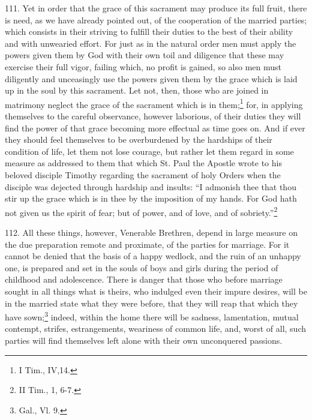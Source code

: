 \documentclass[12pt,a4paper]{book}
\begin{document}
111. Yet in order that the grace of this sacrament may produce its full fruit, there is need, as we have already pointed out, of the cooperation of the married parties; which consists in their striving to fulfill their duties to the best of their ability and with unwearied effort. For just as in the natural order men must apply the powers given them by God with their own toil and diligence that these may exercise their full vigor, failing which, no profit is gained, so also men must diligently and unceasingly use the powers given them by the grace which is laid up in the soul by this sacrament. Let not, then, those who are joined in matrimony neglect the grace of the sacrament which is in them;\footnote{I Tim., IV,14.} for, in applying themselves to the careful observance, however laborious, of their duties they will find the power of that grace becoming more effectual as time goes on. And if ever they should feel themselves to be overburdened by the hardships of their condition of life, let them not lose courage, but rather let them regard in some measure as addressed to them that which St. Paul the Apostle wrote to his beloved disciple Timothy regarding the sacrament of holy Orders when the disciple was dejected through hardship and insults: ``I admonish thee that thou stir up the grace which is in thee by the imposition of my hands. For God hath not given us the spirit of fear; but of power, and of love, and of sobriety.''\footnote{II Tim., 1, 6-7.}

112. All these things, however, Venerable Brethren, depend in large measure on the due preparation remote and proximate, of the parties for marriage. For it cannot be denied that the basis of a happy wedlock, and the ruin of an unhappy one, is prepared and set in the souls of boys and girls during the period of childhood and adolescence. There is danger that those who before marriage sought in all things what is theirs, who indulged even their impure desires, will be in the married state what they were before, that they will reap that which they have sown;\footnote{Gal., Vl. 9.} indeed, within the home there will be sadness, lamentation, mutual contempt, strifes, estrangements, weariness of common life, and, worst of all, such parties will find themselves left alone with their own unconquered passions.
\end{document}
